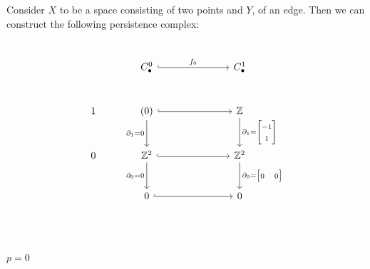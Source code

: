 \documentclass[11pt,a4paper]{report}
\begin{document}
              \begin{Ex} Consider $X$ to be a space consisting of two points and $Y$, of an edge.
              Then we can construct the following persistence complex: \\

              \begin{center}
              \end{center}
              \begin{align*}
                \\
                \begin{tikzcd}[ampersand replacement=\&, sep=large]
                  \& C_\bullet^0 \arrow[hookrightarrow]{rr}{f_0} \&\& C_\bullet^1 \\
                  1 \& (0) \arrow[hookrightarrow]{rr} \arrow[d,swap,"\partial_1=0"]          \&\& \mathbb{Z} \arrow[d,"\partial_1={\begin{bmatrix}-1\\1\end{bmatrix}}"]\\
                  0 \& \mathbb{Z}^2 \arrow[hookrightarrow]{rr} \arrow[d,swap,"\partial_0=0"] \&\& \mathbb{Z}^2 \arrow[d,"\partial_0={\begin{bmatrix}0&0\end{bmatrix}}"]\\
                  \& 0 \arrow[hookrightarrow]{rr}              \&\& 0\\
                \end{tikzcd}
              \end{align*}
              \\
              \underline{$p = 0$}
              \begin{align*}

\end{align*}
\end{Ex}
\end{document}
